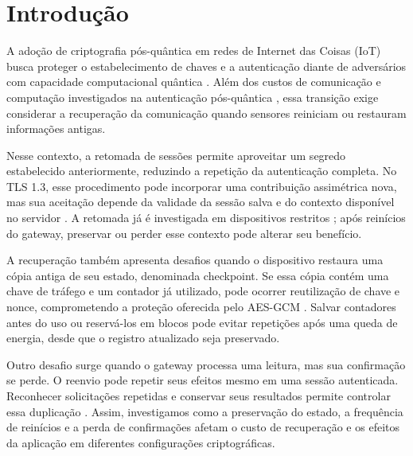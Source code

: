\section{Introdução}

A adoção de criptografia pós-quântica em redes de Internet das Coisas (IoT) busca proteger o estabelecimento de chaves e a autenticação diante de adversários com capacidade computacional quântica \cite{liu2024postquantum}. Além dos custos de comunicação e computação investigados na autenticação pós-quântica \cite{schwabe2021kemtlspdk}, essa transição exige considerar a recuperação da comunicação quando sensores reiniciam ou restauram informações antigas.

Nesse contexto, a retomada de sessões permite aproveitar um segredo estabelecido anteriormente, reduzindo a repetição da autenticação completa. No TLS 1.3, esse procedimento pode incorporar uma contribuição assimétrica nova, mas sua aceitação depende da validade da sessão salva e do contexto disponível no servidor \cite{hebrok2023tickets}. A retomada já é investigada em dispositivos restritos \cite{avoine2019iotfriendly}; após reinícios do gateway, preservar ou perder esse contexto pode alterar seu benefício.

A recuperação também apresenta desafios quando o dispositivo restaura uma cópia antiga de seu estado, denominada checkpoint. Se essa cópia contém uma chave de tráfego e um contador já utilizado, pode ocorrer reutilização de chave e nonce, comprometendo a proteção oferecida pelo AES-GCM \cite{bock2016nonce}. Salvar contadores antes do uso ou reservá-los em blocos pode evitar repetições após uma queda de energia, desde que o registro atualizado seja preservado.

Outro desafio surge quando o gateway processa uma leitura, mas sua confirmação se perde. O reenvio pode repetir seus efeitos mesmo em uma sessão autenticada. Reconhecer solicitações repetidas e conservar seus resultados permite controlar essa duplicação \cite{lee2015rifl}. Assim, investigamos como a preservação do estado, a frequência de reinícios e a perda de confirmações afetam o custo de recuperação e os efeitos da aplicação em diferentes configurações criptográficas.

